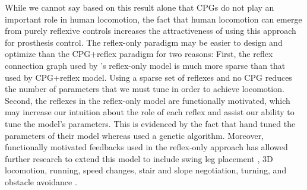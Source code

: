 While we cannot say based on this result alone that CPGs do not play an
important role in human locomotion, the fact that human locomotion can emerge
from purely reflexive controls increases the attractiveness of using this
approach for prosthesis control. The reflex-only paradigm may be easier to
design and optimize than the CPG+reflex paradigm for two reasons: First, the
reflex connection graph used by \citet{geyer2010muscle}'s reflex-only model is
much more sparse than that used by \citet{ogihara2001generation} CPG+reflex
model. Using a sparse set of reflexes and no CPG reduces the number of
parameters that we must tune in order to achieve locomotion. Second, the
reflexes in the reflex-only model are functionally motivated, which may increase
our intuition about the role of each reflex and assist our ability to tune the
model's parameters. This is evidenced by the fact that
\citeauthor{geyer2010muscle} hand tuned the parameters of their model whereas
\citeauthor{ogihara2001generation} used a genetic algorithm.  Moreover,
functionally motivated feedbacks used in the reflex-only approach has allowed
further research to extend this model to include swing leg placement
\citep{desai2013muscle}, 3D locomotion, running, speed changes, stair and slope
negotiation, turning, and obstacle avoidance \citep{song2015neural}.  


